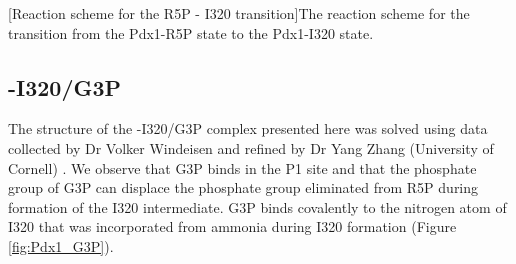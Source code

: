 \begin{minipage}[!htbp]{\linewidth}
	[Reaction scheme for the R5P - I320 transition]{The reaction scheme for the transition from the Pdx1-R5P state to the Pdx1-I320 state.\label{fig:R5PtoI320}} 		
\end{minipage}  
\clearpage
%
%

\subsection{\atpdx -I320/G3P}
The structure of the \atpdx -I320/G3P complex presented here was solved using data collected by Dr Volker Windeisen and refined by Dr Yang Zhang (University of Cornell) \cite{Windeisen2013}. We observe that G3P binds in the P1 site and that the phosphate group of G3P can displace the phosphate group eliminated from R5P during formation of the I320 intermediate. G3P binds covalently to the nitrogen atom of I320 that was incorporated from ammonia during I320 formation (Figure \ref{fig:Pdx1_G3P}). %

